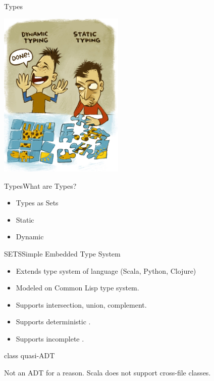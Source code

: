 
\begin{frame}{Types}
  \centering
  
    \includegraphics[height=8cm]{typing.png}
\end{frame}

\begin{frame}{Types}{What are Types?}
  \begin{itemize}
  \item Types as Sets
  \item Static
  \item Dynamic
  \end{itemize}
\end{frame}

\begin{frame}{SETS}{Simple Embedded Type System}

  \scalebox{1.0}{}

  \begin{itemize}
  \item   Extends type system of language (Scala, Python, Clojure)
  \item   Modeled on Common Lisp type system.
  \item   Supports intersection, union, complement.
  \item   Supports deterministic .
  \item   Supports incomplete .
  \end{itemize}
\end{frame}

\begin{frame}{ class quasi-ADT}
  \scalebox{0.8}{}

  \medskip

  Not an ADT for a  reason.  Scala does not support cross-file  classes.

\end{frame}


